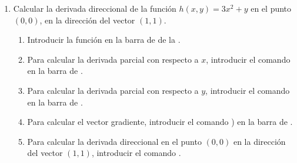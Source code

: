 \begin{enumerate}[leftmargin=*]

\item Calcular la derivada direccional de la función $h(x,y)= 3x^2+y$ en el punto $(0,0)$, en la dirección del vector $(1,1)$.
      \begin{indication}
      \begin{enumerate}
      \item Introducir la función  en la barra de  de la .
      \item Para calcular la derivada parcial con respecto a $x$, introducir el comando  en la barra de .
      \item Para calcular la derivada parcial con respecto a $y$, introducir el comando  en la barra de .
      \item Para calcular el vector gradiente, introducir el comando ) en la barra de .
      \item Para calcular la derivada direccional en el punto $(0,0)$ en la dirección del vector $(1,1)$, introducir el comando .
      \end{enumerate}
      \end{indication}


\end{enumerate}
